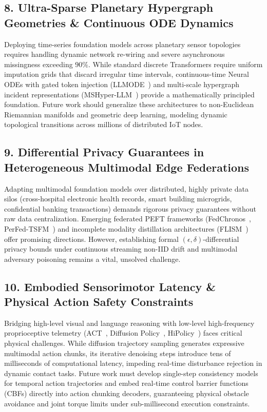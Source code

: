 \subsection{8. Ultra-Sparse Planetary Hypergraph Geometries \& Continuous ODE Dynamics}
Deploying time-series foundation models across planetary sensor topologies requires handling dynamic network re-wiring and severe asynchronous missingness exceeding $90\%$. While standard discrete Transformers require uniform imputation grids that discard irregular time intervals, continuous-time Neural ODEs with gated token injection (LLMODE~\cite{Zhang2026LLMODE}) and multi-scale hypergraph incident representations (MSHyper-LLM~\cite{Shang2026MSHyperLLM}) provide a mathematically principled foundation. Future work should generalize these architectures to non-Euclidean Riemannian manifolds and geometric deep learning, modeling dynamic topological transitions across millions of distributed IoT nodes.

\subsection{9. Differential Privacy Guarantees in Heterogeneous Multimodal Edge Federations}
Adapting multimodal foundation models over distributed, highly private data silos (cross-hospital electronic health records, smart building microgrids, confidential banking transactions) demands rigorous privacy guarantees without raw data centralization. Emerging federated PEFT frameworks (FedChronos~\cite{Sharma2026FedChronos}, PerFed-TSFM~\cite{Nihalchandani2026PerFedTSFM}) and incomplete modality distillation architectures (FLISM~\cite{Orzikulova2024FedImpHC}) offer promising directions. However, establishing formal $(\epsilon, \delta)$-differential privacy bounds under continuous streaming non-IID drift and multimodal adversary poisoning remains a vital, unsolved challenge.

\subsection{10. Embodied Sensorimotor Latency \& Physical Action Safety Constraints}
Bridging high-level visual and language reasoning with low-level high-frequency proprioceptive telemetry (ACT~\cite{Zhao2023ACT}, Diffusion Policy~\cite{Chi2023DiffusionPolicy}, HiPolicy~\cite{Zhang2026HiPolicy}) faces critical physical challenges. While diffusion trajectory sampling generates expressive multimodal action chunks, its iterative denoising steps introduce tens of milliseconds of computational latency, impeding real-time disturbance rejection in dynamic contact tasks. Future work must develop single-step consistency models for temporal action trajectories and embed real-time control barrier functions (CBFs) directly into action chunking decoders, guaranteeing physical obstacle avoidance and joint torque limits under sub-millisecond execution constraints.

